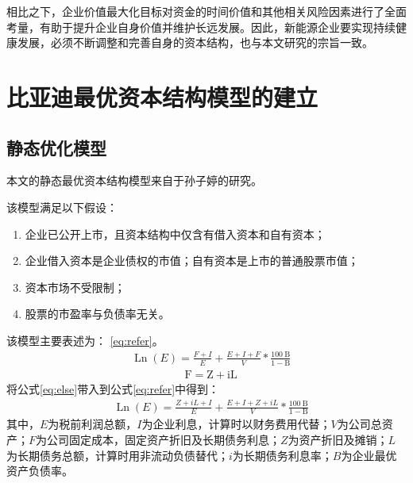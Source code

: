 相比之下，企业价值最大化目标对资金的时间价值和其他相关风险因素进行了全面考量，有助于提升企业自身价值并维护长远发展。因此，新能源企业要实现持续健康发展，必须不断调整和完善自身的资本结构，也与本文研究的宗旨一致。

\section{比亚迪最优资本结构模型的建立}
\subsection{静态优化模型}
本文的静态最优资本结构模型来自于孙子婷的研究\cite{Sun2020}。

该模型满足以下假设：
\begin{enumerate}[label=(\arabic*)]
    \item 企业已公开上市，且资本结构中仅含有借入资本和自有资本；
    \item 企业借入资本是企业债权的市值；自有资本是上市的普通股票市值；
    \item 资本市场不受限制；
    \item 股票的市盈率与负债率无关。
\end{enumerate}
该模型主要表述为：
\eqref{eq:refer}。
\begin{equation}
\begin{aligned}
& \operatorname{Ln}(E)=\frac{F+I}{E}+\frac{E+I+F}{V} * \frac{100 \mathrm{~B}}{1-\mathrm{B}} 
  \label{eq:refer}
\end{aligned}
\end{equation}
\begin{equation}
\begin{aligned}
& \mathrm{F}=\mathrm{Z}+\mathrm{iL}
\label{eq:else}
\end{aligned}
\end{equation}
将公式\eqref{eq:else}带入到公式\eqref{eq:refer}中得到：
\begin{equation}
\begin{aligned}
& \operatorname{Ln}(E)=\frac{Z+iL+I}{E}+\frac{E+I+Z+iL}{V} * \frac{100 \mathrm{~B}}{1-\mathrm{B}} 
  \label{eq:main}
\end{aligned}
\end{equation}
其中，$E$为税前利润总额，$I$为企业利息，计算时以财务费用代替；$V$为公司总资产；$F$为公司固定成本，固定资产折旧及长期债务利息；$Z$为资产折旧及摊销；$L$为长期债务总额，计算时用非流动负债替代；$i$为长期债务利息率；$B$为企业最优资产负债率。
